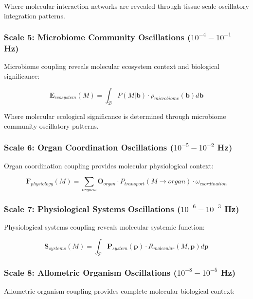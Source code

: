 \documentclass[12pt,a4paper]{article}
\begin{document}
Where molecular interaction networks are revealed through tissue-scale oscillatory integration patterns.

\subsubsection{Scale 5: Microbiome Community Oscillations ($10^{-4}-10^{-1}$ Hz)}

Microbiome coupling reveals molecular ecosystem context and biological significance:

\begin{equation}
\mathbf{E}_{ecosystem}(M) = \int_{\mathcal{B}} P(M|\mathbf{b}) \cdot \rho_{microbiome}(\mathbf{b}) d\mathbf{b}
\end{equation}

Where molecular ecological significance is determined through microbiome community oscillatory patterns.

\subsubsection{Scale 6: Organ Coordination Oscillations ($10^{-5}-10^{-2}$ Hz)}

Organ coordination coupling provides molecular physiological context:

\begin{equation}
\mathbf{F}_{physiology}(M) = \sum_{organs} \mathbf{O}_{organ} \cdot P_{transport}(M \to organ) \cdot \omega_{coordination}
\end{equation}

\subsubsection{Scale 7: Physiological Systems Oscillations ($10^{-6}-10^{-3}$ Hz)}

Physiological systems coupling reveals molecular systemic function:

\begin{equation}
\mathbf{S}_{systems}(M) = \int_{\mathcal{P}} \mathbf{P}_{system}(\mathbf{p}) \cdot R_{molecular}(M, \mathbf{p}) d\mathbf{p}
\end{equation}

\subsubsection{Scale 8: Allometric Organism Oscillations ($10^{-8}-10^{-5}$ Hz)}

Allometric organism coupling provides complete molecular biological context:
\end{document}
